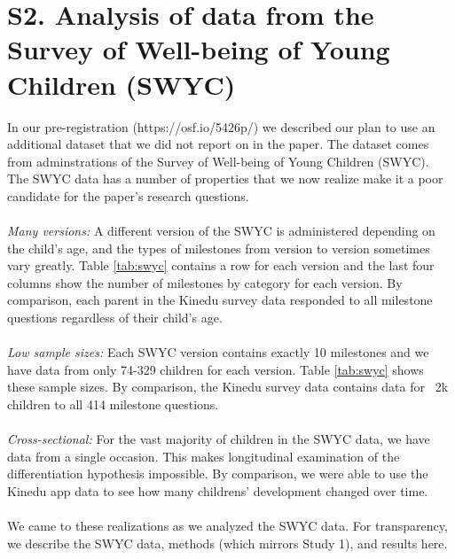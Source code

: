 \documentclass[9pt,twoside,lineno]{pnas-new}
\begin{document}
\section*{S2. Analysis of data from the Survey of Well-being of Young Children (SWYC)}

In our pre-registration (https://osf.io/5426p/) we described our plan to use an additional dataset that we did not report on in the paper. The dataset comes from adminstrations of the Survey of Well-being of Young Children (SWYC). The SWYC data has a number of properties that we now realize make it a poor candidate for the paper's research questions.
\\\\
\textit{Many versions:} A different version of the SWYC is administered depending on the child's age, and the types of milestones from version to version sometimes vary greatly. Table \ref{tab:swyc} contains a row for each version and the last four columns show the number of milestones by category for each version. By comparison, each parent in the Kinedu survey data responded to all milestone questions regardless of their child's age.
\\\\
\textit{Low sample sizes:} Each SWYC version contains exactly 10 milestones and we have data from only 74-329 children for each version. Table \ref{tab:swyc} shows these sample sizes. By comparison, the Kinedu survey data contains data for ~2k children to all 414 milestone questions.
\\\\
\textit{Cross-sectional:} For the vast majority of children in the SWYC data, we have data from a single occasion. This makes longitudinal examination of the differentiation hypothesis impossible. By comparison, we were able to use the Kinedu app data to see how many childrens' development changed over time.
\\\\
We came to these realizations as we analyzed the SWYC data. For transparency, we describe the SWYC data, methods (which mirrors Study 1), and results here.
\end{document}
